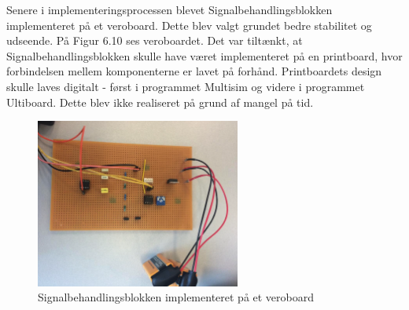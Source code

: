 Senere i implementeringsprocessen blevet Signalbehandlingsblokken implementeret på et veroboard. Dette blev valgt grundet bedre stabilitet og udseende. På Figur 6.10 ses veroboardet. Det var tiltænkt, at Signalbehandlingsblokken skulle have været implementeret på en printboard, hvor forbindelsen mellem komponenterne er lavet på forhånd. Printboardets design skulle laves digitalt - først i programmet Multisim og videre i programmet Ultiboard. Dette blev ikke realiseret på grund af mangel på tid.

\begin{figure}[H]
	\centering
	\includegraphics[width=0.6\textwidth]{Figurer/Snip20151207_46}
	\caption{Signalbehandlingsblokken implementeret på et veroboard}
\end{figure}

